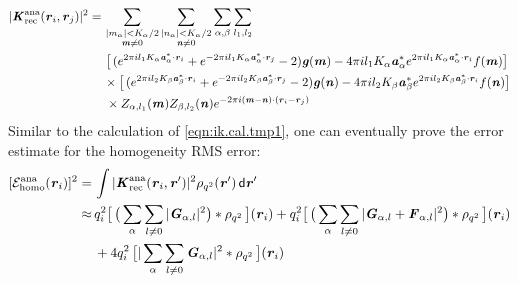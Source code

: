\documentclass[aps,pre,preprint,unsortedaddress]{revtex4}
\renewcommand{\v}[1]{\textbf{\textit{#1}}}
\renewcommand{\d}[1]{\textsf{#1}}
\begin{document}
\begin{align}
  \vert\v K^{\textrm{ana}}_{\textrm{rec}}(\v r_i,\v r_j)\vert^2
  =\,&
  \sum_{
    \begin{subarray}{c}
      \vert m_{\alpha}\vert < K_\alpha/2\\
      \v m\neq 0
    \end{subarray}}
  \sum_{
    \begin{subarray}{c}
      \vert n_{\alpha}\vert < K_\alpha/2\\
      \v n\neq 0
    \end{subarray}}
  \sum_{\alpha,\beta}
  \sum_{l_1,l_2}
  \\\nonumber
  &\,
  \big[
  \,(
  e^{2\pi i l_1 K_\alpha\v a^\ast_\alpha\cdot \v r_i} +
  e^{-2\pi i l_1 K_\alpha\v a^\ast_\alpha\cdot \v r_j}
  - 2
  )
  \v g(\v m)
  - 4\pi i l_1 K_\alpha\v a_\alpha^\ast e^{2\pi i l_1 K_\alpha\v a^\ast_\alpha\cdot \v r_i}
  f(\v m)
  \big] \\\nonumber
  \,&
  \times
  \big[
  \,(
  e^{2\pi i l_2 K_\beta\v a^\ast_\beta\cdot \v r_i} +
  e^{-2\pi i l_2 K_\beta\v a^\ast_\beta\cdot \v r_j}
  - 2
  )
  \v g(\v n)
  - 4\pi i l_2 K_\beta\v a_\beta^\ast e^{2\pi i l_2 K_\beta\v a^\ast_\beta\cdot \v r_i}
  f(\v n)
  \big]
  \\
  &\,
  \times
  Z_{\alpha,l_1}(\v m)Z_{\beta,l_2}(\v n)
  e^{-2\pi i(\v m-\v n)\cdot(\v r_i-\v r_j)}
\end{align}
Similar to the calculation of \eqref{eqn:ik.cal.tmp1}, one can eventually
prove the error estimate for the homogeneity RMS error:
\begin{align}\nonumber
  [\mathcal E^{\textrm{ana}}_{\textrm{homo}}(\v r_i)]^2
  = \,&
  \int
  \vert\v K^{\textrm{ana}}_{\textrm{rec}}(\v r_i,\v r')\vert^2
  \rho_{q^2}(\v r')\,\d d\v r' \\\nonumber
  \approx\,&  
  q_i^2
  \big[\,
  \big(
  \sum_{\alpha} \sum_{l\neq 0}
  \vert \v G_{\alpha,l}\vert^2
  \big)
  \ast \rho_{q^2}
  \,\big] (\v r_i) +
  q_i^2
  \big[\,
  \big(
  \sum_{\alpha} \sum_{l\neq 0}
  \vert \v G_{\alpha,l} +\v F_{\alpha,l}\vert^2
  \big)
  \ast \rho_{q^2}
  \,\big] (\v r_i) \\
  \,&+
  4q_i^2\,
  \big[
  \vert
  \sum_{\alpha} \sum_{l\neq 0}  
  \v G_{\alpha,l}
  \vert^2
  \ast \rho_{q^2}\,
  \big] (\v r_i) 
\end{align}
\end{document}
